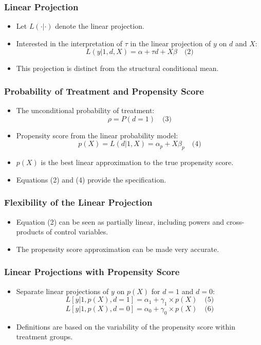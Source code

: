 \documentclass{beamer}
\begin{document}
\begin{frame}
\frametitle{Linear Projection}
\begin{itemize}
    \item Let \( L(\cdot | \cdot) \) denote the linear projection.
    \item Interested in the interpretation of \( \tau \) in the linear projection of \( y \) on \( d \) and \( X \):
    \[ L(y | 1, d, X) = \alpha + \tau d + X\beta \quad \text{(2)} \]
    \item This projection is distinct from the structural conditional mean.
\end{itemize}
\end{frame}

\begin{frame}
\frametitle{Probability of Treatment and Propensity Score}
\begin{itemize}
    \item The unconditional probability of treatment:
    \[ \rho = P(d = 1) \quad \text{(3)} \]
    \item Propensity score from the linear probability model:
    \[ p(X) = L(d | 1, X) = \alpha_p + X\beta_p \quad \text{(4)} \]
    \item \( p(X) \) is the best linear approximation to the true propensity score.
    \item Equations (2) and (4) provide the specification.
\end{itemize}
\end{frame}

\begin{frame}
\frametitle{Flexibility of the Linear Projection}
\begin{itemize}
    \item Equation (2) can be seen as partially linear, including powers and cross-products of control variables.
    \item The propensity score approximation can be made very accurate.
\end{itemize}
\end{frame}

\begin{frame}
\frametitle{Linear Projections with Propensity Score}
\begin{itemize}
    \item Separate linear projections of \( y \) on \( p(X) \) for \( d = 1 \) and \( d = 0 \):
    \[ L[y | 1, p(X), d = 1] = \alpha_1 + \gamma_1 \times p(X) \quad \text{(5)} \]
    \[ L[y | 1, p(X), d = 0] = \alpha_0 + \gamma_0 \times p(X) \quad \text{(6)} \]
    \item Definitions are based on the variability of the propensity score within treatment groups.
\end{itemize}
\end{frame}
\end{document}
